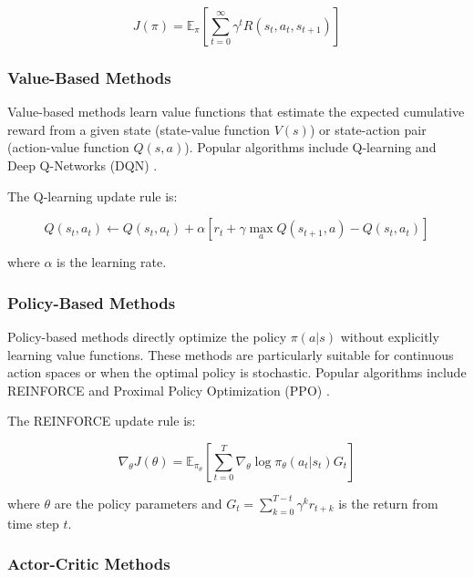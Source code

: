 \documentclass{article}
\begin{document}
\begin{equation}
J(\pi) = \mathbb{E}_{\pi}\left[\sum_{t=0}^{\infty} \gamma^t R(s_t, a_t, s_{t+1})\right]
\end{equation}

\subsubsection{Value-Based Methods}

Value-based methods learn value functions that estimate the expected cumulative reward from a given state (state-value function $V(s)$) or state-action pair (action-value function $Q(s,a)$). Popular algorithms include Q-learning \cite{watkins1992q} and Deep Q-Networks (DQN) \cite{mnih2015human}.

The Q-learning update rule is:

\begin{equation}
Q(s_t, a_t) \leftarrow Q(s_t, a_t) + \alpha \left[r_t + \gamma \max_{a} Q(s_{t+1}, a) - Q(s_t, a_t)\right]
\end{equation}

where $\alpha$ is the learning rate.

\subsubsection{Policy-Based Methods}

Policy-based methods directly optimize the policy $\pi(a|s)$ without explicitly learning value functions. These methods are particularly suitable for continuous action spaces or when the optimal policy is stochastic. Popular algorithms include REINFORCE \cite{williams1992simple} and Proximal Policy Optimization (PPO) \cite{schulman2017proximal}.

The REINFORCE update rule is:

\begin{equation}
\nabla_{\theta} J(\theta) = \mathbb{E}_{\pi_{\theta}}\left[\sum_{t=0}^{T} \nabla_{\theta} \log \pi_{\theta}(a_t|s_t) G_t\right]
\end{equation}

where $\theta$ are the policy parameters and $G_t = \sum_{k=0}^{T-t} \gamma^k r_{t+k}$ is the return from time step $t$.

\subsubsection{Actor-Critic Methods}
\end{document}
